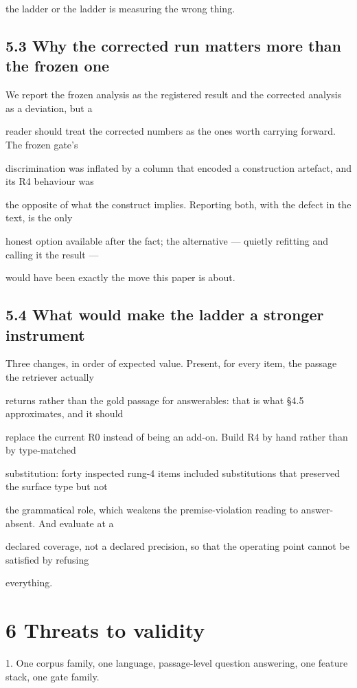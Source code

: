 the ladder or the ladder is measuring the wrong thing.

\subsection{5.3 Why the corrected run matters more than the frozen one}
We report the frozen analysis as the registered result and the corrected analysis as a deviation, but a

reader should treat the corrected numbers as the ones worth carrying forward. The frozen gate's

discrimination was inflated by a column that encoded a construction artefact, and its R4 behaviour was

the opposite of what the construct implies. Reporting both, with the defect in the text, is the only

honest option available after the fact; the alternative --- quietly refitting and calling it the result ---

would have been exactly the move this paper is about.

\subsection{5.4 What would make the ladder a stronger instrument}
Three changes, in order of expected value. Present, for every item, the passage the retriever actually

returns rather than the gold passage for answerables: that is what §4.5 approximates, and it should

replace the current R0 instead of being an add-on. Build R4 by hand rather than by type-matched

substitution: forty inspected rung-4 items included substitutions that preserved the surface type but not

the grammatical role, which weakens the premise-violation reading to answer-absent. And evaluate at a

declared coverage, not a declared precision, so that the operating point cannot be satisfied by refusing

everything.

\section{6 Threats to validity}
1. One corpus family, one language, passage-level question answering, one feature stack, one gate family.

